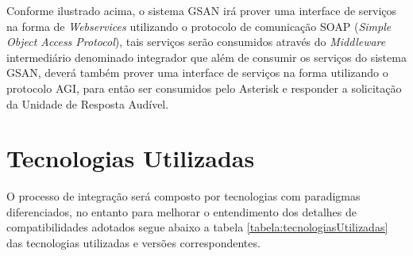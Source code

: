 Conforme ilustrado acima, o sistema GSAN irá prover uma interface de serviços na forma de \textit{Webservices} utilizando o protocolo de comunicação SOAP (\textit{Simple Object Access Protocol}), tais serviços serão consumidos através do \textit{Middleware} intermediário denominado integrador que além de consumir os serviços do sistema GSAN, deverá também prover uma interface de serviços na forma utilizando o protocolo AGI, para então ser consumidos pelo Asterisk e responder a solicitação da Unidade de Resposta Audível.


\section{Tecnologias Utilizadas}
O processo de integração será composto por tecnologias com paradigmas diferenciados, no entanto para melhorar o entendimento dos detalhes de compatibilidades adotados segue abaixo a tabela \ref{tabela:tecnologiasUtilizadas}
	 das tecnologias utilizadas e versões correspondentes.


